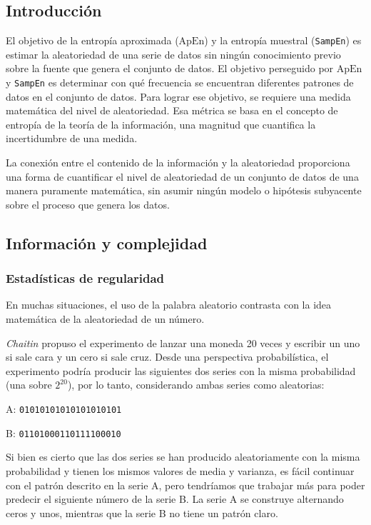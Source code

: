 \documentclass[a4paper,12pt]{article}
\begin{document}
\subsection{Introducción}
El objetivo de la entropía aproximada ($\textrm{ApEn}$) y la entropía muestral (\texttt{SampEn}) es estimar la aleatoriedad de una serie de datos sin ningún conocimiento previo sobre la fuente que genera el conjunto de datos. El objetivo perseguido por $\textrm{ApEn}$ y \texttt{SampEn} es determinar con qué frecuencia se encuentran diferentes patrones de datos en el conjunto de datos. Para lograr ese objetivo, se requiere una medida matemática del nivel de aleatoriedad. Esa métrica se basa en el concepto de entropía de la teoría de la información, una magnitud que cuantifica la incertidumbre de una medida.

La conexión entre el contenido de la información y la aleatoriedad proporciona una forma de cuantificar el nivel de aleatoriedad de un conjunto de datos de una manera puramente matemática, sin asumir ningún modelo o hipótesis subyacente sobre el proceso que genera los datos. 

\subsection{Información y complejidad}
\subsubsection{Estadísticas de regularidad} 
En muchas situaciones, el uso de la palabra aleatorio contrasta con la idea matemática de la aleatoriedad de un número. 

\textit{Chaitin} \citep{chaitin} propuso el experimento de lanzar una moneda 20 veces y escribir un uno si sale cara y un cero si sale cruz. Desde una perspectiva probabilística, el experimento podría producir las siguientes dos series con la misma probabilidad (una sobre $2^{20}$), por lo tanto, considerando ambas series como aleatorias:

\vfill

A: \texttt{01010101010101010101}

B: \texttt{01101000110111100010}

\vfill

Si bien es cierto que las dos series se han producido aleatoriamente con la misma probabilidad y tienen los mismos valores de media y varianza, es fácil continuar con el patrón descrito en la serie A, pero tendríamos que trabajar más para poder predecir el siguiente número de la serie B. La serie A se construye alternando ceros y unos, mientras que la serie B no tiene un patrón claro. 
\end{document}
